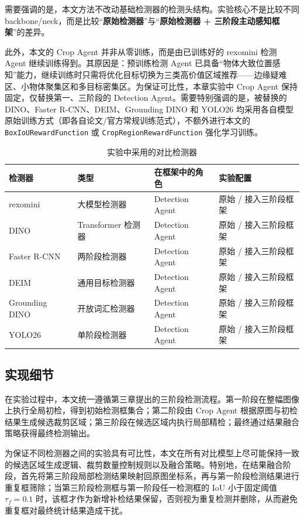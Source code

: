 需要强调的是，本文方法不改动基础检测器的检测头结构。实验核心不是比较不同 backbone/neck，而是比较“\textbf{原始检测器}”与“\textbf{原始检测器 + 三阶段主动感知框架}”的差异。

此外，本文的 Crop Agent 并非从零训练，而是由已训练好的 rexomini 检测 Agent 继续训练得到。其原因是：预训练检测 Agent 已具备“物体大致位置感知”能力，继续训练时只需将优化目标切换为三类高价值区域推荐——边缘疑难区、小物体聚集区和多目标密集区。为保证可比性，本章实验中 Crop Agent 保持固定，仅替换第一、三阶段的 Detection Agent。需要特别强调的是，被替换的 DINO、Faster R-CNN、DEIM、Grounding DINO 和 YOLO26 均采用各自模型原始训练方式（即各自论文/官方常规训练范式），不额外进行本文的 \texttt{BoxIoURewardFunction} 或 \texttt{CropRegionRewardFunction} 强化学习训练。

\begin{table}[htbp]
    \centering
    \caption{实验中采用的对比检测器}
    \label{tab:compared_detectors}
    \begin{tabular}{llll}
        \toprule
        检测器 & 类型 & 在框架中的角色 & 实验配置 \\
        \midrule
        rexomini & 大模型检测器 & Detection Agent & 原始 / 接入三阶段框架 \\
        DINO & Transformer 检测器 & Detection Agent & 原始 / 接入三阶段框架 \\
        Faster R-CNN & 两阶段检测器 & Detection Agent & 原始 / 接入三阶段框架 \\
        DEIM & 通用目标检测器 & Detection Agent & 原始 / 接入三阶段框架 \\
        Grounding DINO & 开放词汇检测器 & Detection Agent & 原始 / 接入三阶段框架 \\
        YOLO26 & 单阶段检测器 & Detection Agent & 原始 / 接入三阶段框架 \\
        \bottomrule
    \end{tabular}
\end{table}

\subsection{实现细节}
\label{subsec:implementation_details}

在实验过程中，本文统一遵循第三章提出的三阶段检测流程。第一阶段在整幅图像上执行全局初检，得到初始检测框集合；第二阶段由 Crop Agent 根据原图与初检结果生成候选裁剪区域；第三阶段在候选区域内执行局部精检；最终通过结果融合策略获得最终检测输出。

为保证不同检测器之间的实验具有可比性，本文在所有对比模型上尽可能保持一致的候选区域生成逻辑、裁剪数量控制规则以及融合策略。特别地，在结果融合阶段，首先将第三阶段局部检测结果映射回原图坐标系，再与第一阶段检测结果进行重复框筛除；当第三阶段检测框与第一阶段任一检测框的 IoU 小于固定阈值 $\tau_f=0.1$ 时，该框才作为新增补检结果保留，否则视为重复检测并删除，从而避免重复框对最终统计结果造成干扰。


